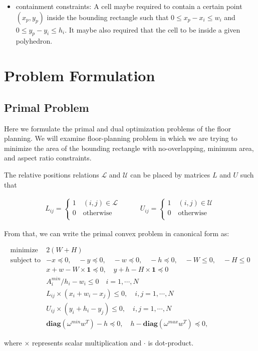 \documentclass[12pt] {article}
\begin{document}
\begin{itemize}
\item containment constraints: A cell maybe required to contain a certain point $(x_{p},y_{p})$ inside the bounding rectangle such that $0\leq x_{p}-x_{i}\leq w_{i}$ and $0\leq y_{p}-y_{i}\leq h_{i}$. It maybe also required that the cell to be inside a given polyhedron. 

\end{itemize}
\section{Problem Formulation}
\subsection*{Primal Problem}
Here we formulate the primal and dual optimization problems of the floor planning. We will examine floor-planning problem in which we are trying to minimize the area of the bounding rectangle with no-overlapping, minimum area, and aspect ratio constraints. 

The relative positions relations $\mathscr{L}$ and $\mathscr{U}$ can be placed by matrices $L$ and $U$ such that 
\begin{small}
\[
\begin{array}{cc}
L_{ij}=
\begin{cases}
	1 \quad (i,j)\in \mathscr{L} \\
	0 \quad \text{otherwise} \\
\end{cases} 
&
\quad \quad
U_{ij}=
\begin{cases}
	1 \quad (i,j)\in \mathscr{U} \\
	0 \quad \text{otherwise} \\
\end{cases} 
\end{array} 
\]
\end{small}
From that, we can write the primal convex problem in canonical form as:
\begin{small}
\begin{equation}
\begin{array}{cl}
\text{minimize} & 2(W+H) \\
\text{subject to} & -x \preceq 0, \quad -y\preceq 0, \quad -w \preceq 0, \quad -h \preceq 0, \quad -W\leq 0, \quad -H \leq 0\\
& x+w - W\times \textbf{1}\preceq0, \quad y+h -H\times  \textbf{1} \preceq 0\\
& A_{i}^{min}/h_{i}-w_{i}\leq 0 \quad i=1,\cdots, N\\
& L_{ij}\times(x_{i}+w_{i}-x_{j})\leq 0, \quad i,j=1,\cdots, N\\
& U_{ij}\times(y_{i}+h_{i}-y_{j})\leq 0, \quad i,j=1,\cdots, N\\
& \textbf{diag}(\omega^{min}w^{T}) - h \preceq 0, \quad h - \textbf{diag}(\omega^{max}w^{T}) \preceq 0,
\end{array} 
\label{eq:pp}
\end{equation}
\end{small}
where $\times$ represents scalar multiplication and $\cdot$ is dot-product.
\end{document}
